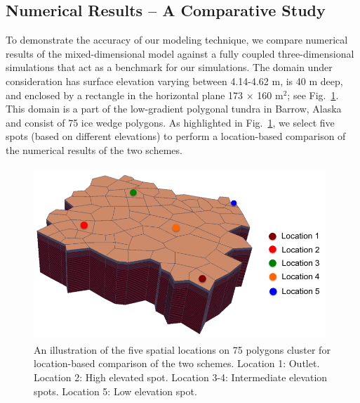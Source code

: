 \documentclass[review,11pt]{elsarticle}
\begin{document}
\subsection {Numerical Results -- A Comparative Study} 
To demonstrate the accuracy of our modeling technique, we compare numerical results of the mixed-dimensional model against a fully coupled three-dimensional simulations that act as a benchmark for our simulations. The domain under consideration has surface elevation varying between 4.14-4.62 m, is 40 m deep, and enclosed by a rectangle in the horizontal plane 173 $\times$ 160 m$^2$; see Fig.~\ref{surf-location}. This domain is a part of the low-gradient polygonal tundra in Barrow, Alaska and consist of 75 ice wedge polygons. As highlighted in Fig.~\ref{surf-location}, we select five spots (based on different elevations) to perform a location-based comparison of the numerical results of the two schemes. 
\begin{figure}[!htpb]
\centering
\includegraphics[height = 6.5cm, width=11cm]{figures/lobster75-3d.png}
\caption{An illustration of the five spatial locations on 75 polygons cluster for location-based comparison of the two schemes. Location 1: Outlet. Location 2: High elevated spot. Location 3-4: Intermediate elevation spots. Location 5: Low elevation spot.}
\label{surf-location}
\end{figure}
\end{document}
